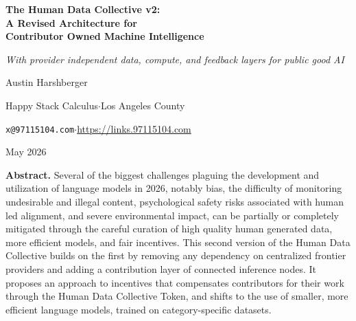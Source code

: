 \documentclass[10pt,a4paper,twocolumn]{article}
\begin{document}
\onecolumn
\thispagestyle{plain}
\begin{center}
{\LARGE\bfseries The Human Data Collective v2:\\[3pt]A Revised Architecture for\\[3pt]Contributor Owned Machine Intelligence\par}
\vspace{6pt}
{\normalsize\itshape With provider independent data, compute, and feedback layers for public good AI\par}
\vspace{10pt}
{\large Austin Harshberger\par}
\vspace{2pt}
{\small Happy Stack Calculus\quad$\cdot$\quad Los Angeles County\par}
{\small \texttt{x@97115104.com}\quad$\cdot$\quad \url{https://links.97115104.com}\par}
\vspace{4pt}
{\small May 2026\par}
\end{center}

\vspace{10pt}
\begin{center}
\begin{minipage}{0.92\textwidth}
\small\textbf{Abstract.}\quad
Several of the biggest challenges plaguing the development and utilization of language models in 2026, notably bias, the difficulty of monitoring undesirable and illegal content, psychological safety risks associated with human led alignment, and severe environmental impact, can be partially or completely mitigated through the careful curation of high quality human generated data, more efficient models, and fair incentives. This second version of the Human Data Collective builds on the first \citep{harshberger2026hdcv1} by removing any dependency on centralized frontier providers and adding a contribution layer of connected inference nodes. It proposes an approach to incentives that compensates contributors for their work through the Human Data Collective Token, and shifts to the use of smaller, more efficient language models, trained on category-specific datasets.
\end{minipage}
\end{center}
\end{document}

